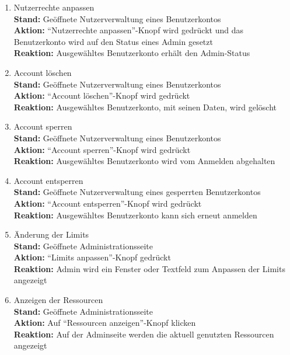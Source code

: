 \begin{enumerate}
    \item Nutzerrechte anpassen
        \\ \textbf{Stand:} Geöffnete Nutzerverwaltung eines Benutzerkontos
        \\ \textbf{Aktion:} \enquote{Nutzerrechte anpassen}-Knopf wird gedrückt und das Benutzerkonto wird auf den Status eines \Gls{Admin} gesetzt
        \\ \textbf{Reaktion:} Ausgewähltes Benutzerkonto erhält den \Gls{Admin}-Status
    \item Account löschen
        \\ \textbf{Stand:} Geöffnete Nutzerverwaltung eines Benutzerkontos
        \\ \textbf{Aktion:} \enquote{Account löschen}-Knopf wird gedrückt
        \\ \textbf{Reaktion:} Ausgewähltes Benutzerkonto, mit seinen Daten, wird gelöscht
    \item Account sperren
        \\ \textbf{Stand:} Geöffnete Nutzerverwaltung eines Benutzerkontos
        \\ \textbf{Aktion:} \enquote{Account sperren}-Knopf wird gedrückt
        \\ \textbf{Reaktion:} Ausgewähltes Benutzerkonto wird vom Anmelden abgehalten
    \item Account entsperren
        \\ \textbf{Stand:} Geöffnete Nutzerverwaltung eines gesperrten Benutzerkontos
        \\ \textbf{Aktion:} \enquote{Account entsperren}-Knopf wird gedrückt
        \\ \textbf{Reaktion:} Ausgewähltes Benutzerkonto kann sich erneut anmelden
    \item Änderung der Limits
        \\ \textbf{Stand:} Geöffnete Administrationsseite
        \\ \textbf{Aktion:} \enquote{Limits anpassen}-Knopf gedrückt
        \\ \textbf{Reaktion:} \gls{Admin} wird ein Fenster oder Textfeld zum Anpassen der Limits angezeigt
    \item Anzeigen der Ressourcen
        \\ \textbf{Stand:} Geöffnete Administrationsseite
        \\ \textbf{Aktion:} Auf \enquote{Ressourcen anzeigen}-Knopf klicken
        \\ \textbf{Reaktion:} Auf der Adminseite werden die aktuell genutzten Ressourcen angezeigt
\end{enumerate}


